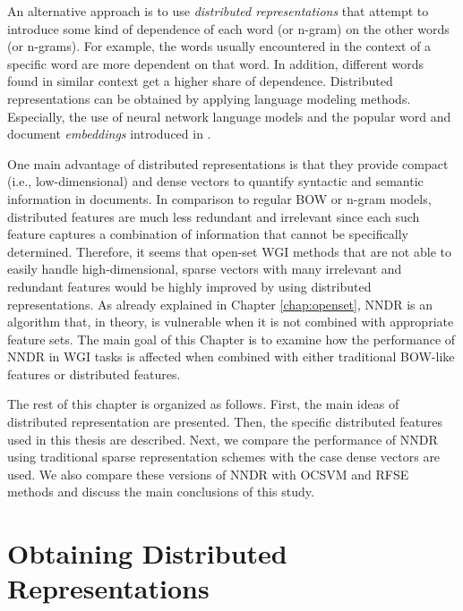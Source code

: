 An alternative approach is to use \textit{distributed representations} that attempt to introduce some kind of dependence of each word (or n-gram) on the other words (or n-grams). For example, the words usually encountered in the context of a specific word are more dependent on that word. In addition, different words found in similar context get a higher share of dependence. Distributed representations can be obtained by applying language modeling methods. Especially, the use of neural network language models and the popular word and document \textit{embeddings} introduced in \parencite{mikolov2013distributed}. 

One main advantage of distributed representations is that they provide compact (i.e., low-dimensional) and dense vectors to quantify syntactic and semantic information in documents. In comparison to regular BOW or n-gram models, distributed features are much less redundant and irrelevant since each such feature captures a combination of information that cannot be specifically determined. Therefore, it seems that open-set WGI methods that are not able to easily handle high-dimensional, sparse vectors with many irrelevant and redundant features would be highly improved by using distributed representations. As already explained in Chapter \ref{chap:openset}, NNDR is an algorithm that, in theory, is vulnerable when it is not combined with appropriate feature sets. The main goal of this Chapter is to examine how the performance of NNDR in WGI tasks is affected when combined with either traditional BOW-like features or distributed features. 

The rest of this chapter is organized as follows. First, the main ideas of distributed representation are presented. Then, the specific distributed features used in this thesis are described. Next, we compare the performance of NNDR using traditional sparse representation schemes with the case dense vectors are used. We also compare these versions of NNDR with OCSVM and RFSE methods and discuss the main conclusions of this study.

\section{Obtaining Distributed Representations}



